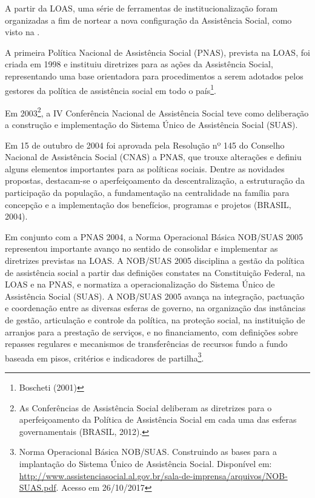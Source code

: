 \documentclass[brazilian]{report}
\begin{document}
A partir da LOAS, uma série de ferramentas de institucionalização foram organizadas a fim de nortear a nova configuração da Assistência Social, como visto na .

\begin{table}[]
\caption{Marcos legais da Assistência Social no Brasil.}
\label{tab:marcos}
\end{table}

A primeira Política Nacional de Assistência Social (PNAS), prevista na LOAS, foi criada em 1998 e instituiu diretrizes para as ações da Assistência Social, representando uma base orientadora para procedimentos a serem adotados pelos gestores da política de assistência social em todo o país\footnote{Boscheti (2001)}.

Em 2003\footnote{As Conferências de Assistência Social deliberam as diretrizes para o aperfeiçoamento da Política de Assistência Social em cada uma das esferas governamentais (BRASIL, 2012).}, a IV Conferência Nacional de Assistência Social teve como deliberação a construção e implementação do Sistema Único de Assistência Social (SUAS).

Em 15 de outubro de 2004 foi aprovada pela Resolução nº 145 do Conselho Nacional de Assistência Social (CNAS) a PNAS, que trouxe alterações e definiu alguns elementos importantes para as políticas sociais. Dentre as novidades propostas, destacam-se o aperfeiçoamento da descentralização, a estruturação da participação da população, a fundamentação na centralidade na família para concepção e a implementação dos benefícios, programas e projetos (BRASIL, 2004).

Em conjunto com a PNAS 2004, a Norma Operacional Básica NOB/SUAS 2005 representou importante avanço no sentido de consolidar e implementar as diretrizes previstas na LOAS. A NOB/SUAS 2005 disciplina a gestão da política de assistência social a partir das definições constates na Constituição Federal, na LOAS e na PNAS, e normatiza a operacionalização do Sistema Único de Assistência Social (SUAS). A NOB/SUAS 2005 avança na integração, pactuação e coordenação entre as diversas esferas de governo, na organização das instâncias de gestão, articulação e controle da política, na proteção social, na instituição de arranjos para a prestação de serviços, e no financiamento, com definições sobre repasses regulares e mecanismos de transferências de recursos fundo a fundo baseada em pisos, critérios e indicadores de partilha\footnote{Norma Operacional Básica NOB/SUAS. Construindo as bases para a implantação do Sistema Único de Assistência Social. Disponível em:  \url{http://www.assistenciasocial.al.gov.br/sala-de-imprensa/arquivos/NOB-SUAS.pdf}. Acesso em 26/10/2017}.
\end{document}
